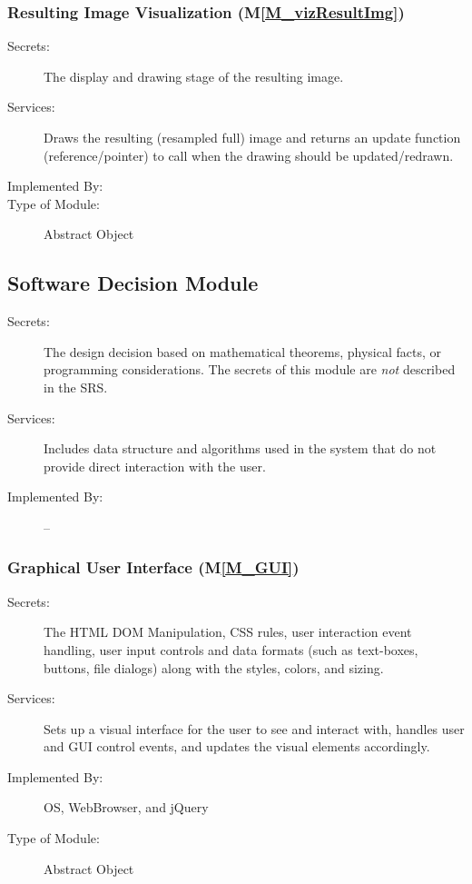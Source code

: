 \documentclass[12pt, titlepage]{article}
\newcommand{\mref}[1]{M\ref{#1}}
\begin{document}
\subsubsection{Resulting Image Visualization (\mref{M_vizResultImg})}
\begin{description}
\item[Secrets:] The display and drawing stage 
of the resulting image.
\item[Services:] Draws the resulting (resampled full) image 
  and returns an update function (reference/pointer) to call when the drawing
  should be updated/redrawn.
\item[Implemented By:] \progname{}
\item[Type of Module:] Abstract Object
\end{description}



\subsection{Software Decision Module}

\begin{description}
\item[Secrets:] The design decision based on mathematical theorems, physical
  facts, or programming considerations. The secrets of this module are
  \emph{not} described in the SRS.
\item[Services:] Includes data structure and algorithms used in the system that
  do not provide direct interaction with the user. 
\item[Implemented By:] --
\end{description}


\subsubsection{Graphical User Interface (\mref{M_GUI})}
\begin{description}
\item[Secrets:] The HTML DOM Manipulation, CSS rules, user interaction event handling,
  user input controls and data formats (such as text-boxes, buttons, file dialogs)
  along with the styles, colors, and sizing.
\item[Services:] Sets up a visual interface for the user to see and interact with,
  handles user and GUI control events, and updates the visual elements accordingly.
\item[Implemented By:] OS, WebBrowser, and jQuery
\item[Type of Module:] Abstract Object
\end{description}
\end{document}
